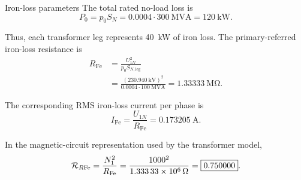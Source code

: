 \begin{formulaBox}{Iron-loss parameters}
	The total rated no-load loss is
	\begin{equation}
		P_0=p_0S_N
		=0.0004\cdot\SI{300}{\mega\volt\ampere}
		=\SI{120}{\kilo\watt}.
	\end{equation}
	
	Thus, each transformer leg represents
	\SI{40}{\kilo\watt} of iron loss. The primary-referred iron-loss resistance is
	\begin{align}
		R_{\mathrm{Fe}}
		&=\frac{U_{1N}^{2}}{p_0S_{N,\mathrm{leg}}}\\
		&=\frac{(\SI{230.940}{\kilo\volt})^2}
		{0.0004\cdot\SI{100}{\mega\volt\ampere}}
		=\boxed{\SI{1.33333}{\mega\ohm}}.
	\end{align}
	
	The corresponding RMS iron-loss current per phase is
	\begin{equation}
		I_{\mathrm{Fe}}
		=\frac{U_{1N}}{R_{\mathrm{Fe}}}
		=\boxed{\SI{0.173205}{\ampere}}.
	\end{equation}
	
	In the magnetic-circuit representation used by the transformer model,
	\begin{equation}
		\mathcal{R}_{R\mathrm{Fe}}
		=\frac{N_1^2}{R_{\mathrm{Fe}}}
		=\frac{1000^2}{\SI{1.33333e6}{\ohm}}
		=\boxed{0.750000}.
	\end{equation}
\end{formulaBox}


